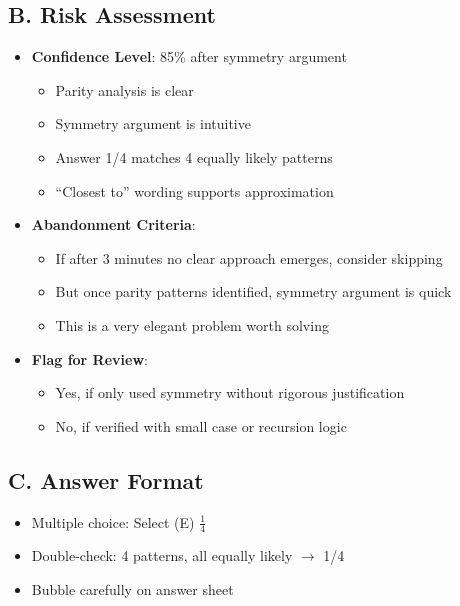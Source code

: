 \documentclass[12pt]{article}
\begin{document}
\begin{competitionbox}
\subsection*{B. Risk Assessment}
\begin{itemize}[leftmargin=*]
    \item \textbf{Confidence Level}: 85\% after symmetry argument
    \begin{itemize}
        \item Parity analysis is clear
        \item Symmetry argument is intuitive
        \item Answer 1/4 matches 4 equally likely patterns
        \item ``Closest to'' wording supports approximation
    \end{itemize}
    \item \textbf{Abandonment Criteria}: 
    \begin{itemize}
        \item If after 3 minutes no clear approach emerges, consider skipping
        \item But once parity patterns identified, symmetry argument is quick
        \item This is a very elegant problem worth solving
    \end{itemize}
    \item \textbf{Flag for Review}: 
    \begin{itemize}
        \item Yes, if only used symmetry without rigorous justification
        \item No, if verified with small case or recursion logic
    \end{itemize}
\end{itemize}

\subsection*{C. Answer Format}
\begin{itemize}[leftmargin=*]
    \item Multiple choice: Select (E) $\frac{1}{4}$
    \item Double-check: 4 patterns, all equally likely $\to$ 1/4 \checkmark
    \item Bubble carefully on answer sheet
\end{itemize}
\end{competitionbox}
\end{document}
